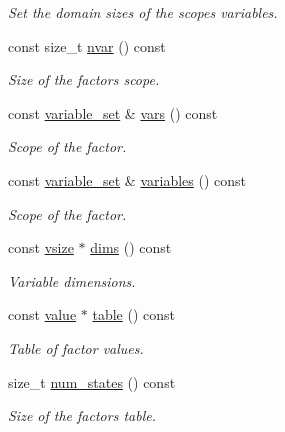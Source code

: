 \begin{DoxyCompactItemize}
\begin{DoxyCompactList}\small\item\em Set the domain sizes of the scope\textquotesingle{}s variables. \end{DoxyCompactList}\item 
const size\+\_\+t \hyperlink{classmerlin_1_1factor_a1eea063e02c9575db8d5f864b50ea240}{nvar} () const 
\begin{DoxyCompactList}\small\item\em Size of the factor\textquotesingle{}s scope. \end{DoxyCompactList}\item 
const \hyperlink{classmerlin_1_1variable__set}{variable\+\_\+set} \& \hyperlink{classmerlin_1_1factor_ac069160a803adfc628279b3709cea611}{vars} () const 
\begin{DoxyCompactList}\small\item\em Scope of the factor. \end{DoxyCompactList}\item 
const \hyperlink{classmerlin_1_1variable__set}{variable\+\_\+set} \& \hyperlink{classmerlin_1_1factor_a67a66c3ff36816e5d8477de382471c6a}{variables} () const 
\begin{DoxyCompactList}\small\item\em Scope of the factor. \end{DoxyCompactList}\item 
const \hyperlink{classmerlin_1_1factor_a31de8d8d0c43cc33dc3874408e75b0fc}{vsize} $\ast$ \hyperlink{classmerlin_1_1factor_a0ae6a3742dabe56f2cd1e7765dad086a}{dims} () const 
\begin{DoxyCompactList}\small\item\em Variable dimensions. \end{DoxyCompactList}\item 
const \hyperlink{classmerlin_1_1factor_a1b14d19e509403448fbef26b003c9281}{value} $\ast$ \hyperlink{classmerlin_1_1factor_a33f69284de0eb8a57bf361abd6d6dc35}{table} () const 
\begin{DoxyCompactList}\small\item\em Table of factor values. \end{DoxyCompactList}\item 
size\+\_\+t \hyperlink{classmerlin_1_1factor_a1744352fa5b29f269503734a3e0fc5ca}{num\+\_\+states} () const 
\begin{DoxyCompactList}\small\item\em Size of the factor\textquotesingle{}s table. \end{DoxyCompactList}\item 

\end{DoxyCompactItemize}
